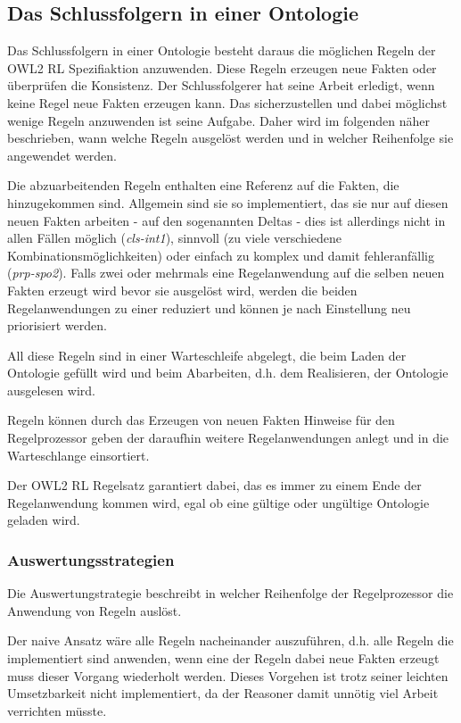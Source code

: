 \subsection{Das Schlussfolgern in einer Ontologie}
Das Schlussfolgern in einer Ontologie besteht daraus die möglichen Regeln der OWL2 RL Spezifiaktion anzuwenden. Diese Regeln erzeugen neue Fakten oder überprüfen die Konsistenz. Der Schlussfolgerer hat seine Arbeit erledigt, wenn keine Regel neue Fakten erzeugen kann. Das sicherzustellen und dabei möglichst wenige Regeln anzuwenden ist seine Aufgabe. Daher wird im folgenden näher beschrieben, wann welche Regeln ausgelöst werden und in welcher Reihenfolge sie angewendet werden.

Die abzuarbeitenden Regeln enthalten eine Referenz auf die Fakten, die hinzugekommen sind. Allgemein sind sie so implementiert, das sie nur auf diesen neuen Fakten arbeiten -  auf den sogenannten Deltas - dies ist allerdings nicht in allen Fällen möglich (\emph{cls-int1}), sinnvoll (zu viele verschiedene Kombinationsmöglichkeiten) oder einfach zu komplex und damit fehleranfällig (\emph{prp-spo2}). Falls zwei oder mehrmals eine Regelanwendung auf die selben neuen Fakten erzeugt wird bevor sie ausgelöst wird, werden die beiden Regelanwendungen zu einer reduziert und können je nach Einstellung neu priorisiert werden.

All diese Regeln sind in einer Warteschleife abgelegt, die beim Laden der Ontologie gefüllt wird und beim Abarbeiten, d.h. dem Realisieren, der Ontologie ausgelesen wird.

Regeln können durch das Erzeugen von neuen Fakten Hinweise für den Regelprozessor geben der daraufhin weitere Regelanwendungen anlegt und in die Warteschlange einsortiert.

Der OWL2 RL Regelsatz garantiert dabei, das es immer zu einem Ende der Regelanwendung kommen wird, egal ob eine gültige oder ungültige Ontologie geladen wird.

\subsubsection{Auswertungsstrategien}
Die Auswertungstrategie beschreibt in welcher Reihenfolge der Regelprozessor die Anwendung von Regeln auslöst. 

Der naive Ansatz wäre alle Regeln nacheinander auszuführen, d.h. alle Regeln die implementiert sind anwenden, wenn eine der Regeln dabei neue Fakten erzeugt muss dieser Vorgang wiederholt werden. Dieses Vorgehen ist trotz seiner leichten Umsetzbarkeit nicht implementiert, da der Reasoner damit unnötig viel Arbeit verrichten müsste.

